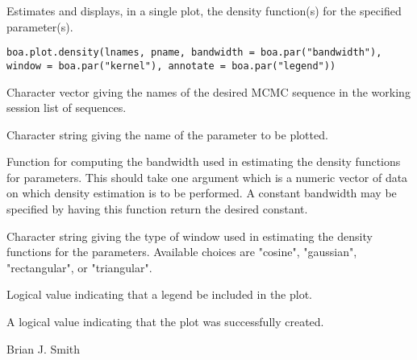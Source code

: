 \begin{Description}\relax
Estimates and displays, in a single plot, the density function(s) for the 
specified parameter(s).
\end{Description}
\begin{Usage}
\begin{verbatim}
boa.plot.density(lnames, pname, bandwidth = boa.par("bandwidth"),
window = boa.par("kernel"), annotate = boa.par("legend"))
\end{verbatim}
\end{Usage}
\begin{Arguments}
\begin{ldescription}
\item[\code{lnames}] Character vector giving the names of the desired MCMC sequence 
in the working session list of sequences.
\item[\code{pname}] Character string giving the name of the parameter to be plotted.
\item[\code{bandwidth}] Function for computing the bandwidth used in estimating the 
density functions for parameters. This should take one argument which is a 
numeric vector of data on which density estimation is to be performed. A 
constant bandwidth may be specified by having this function return the desired 
constant.
\item[\code{window}] Character string giving the type of window used in estimating 
the density functions for the parameters. Available choices are "cosine", 
"gaussian", "rectangular", or "triangular".
\item[\code{annotate}] Logical value indicating that a legend be included in the plot.
\end{ldescription}
\end{Arguments}
\begin{Value}
A logical value indicating that the plot was successfully created.
\end{Value}
\begin{Author}\relax
Brian J. Smith
\end{Author}
\begin{SeeAlso}\relax
{}
\end{SeeAlso}

